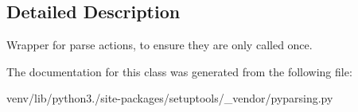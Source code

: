 \subsection{Detailed Description}
\begin{DoxyVerb}Wrapper for parse actions, to ensure they are only called once.
\end{DoxyVerb}
 

The documentation for this class was generated from the following file\+:\begin{DoxyCompactItemize}
\item 
venv/lib/python3./site-\/packages/setuptools/\+\_\+vendor/pyparsing.\+py\end{DoxyCompactItemize}
